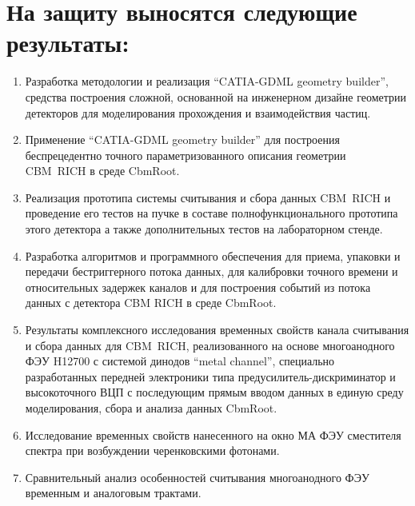 \section*{На защиту выносятся следующие результаты:}

\begin{enumerate}
\item Разработка методологии и реализация ``CATIA-GDML geometry builder'', средства построения сложной, основанной на инженерном дизайне геометрии детекторов для моделирования прохождения и взаимодействия частиц.
\item Применение ``CATIA-GDML geometry builder'' для построения беспрецедентно точного параметризованного описания геометрии CBM~RICH в среде CbmRoot.
\item Реализация прототипа системы считывания и сбора данных CBM~RICH и проведение его тестов на пучке в составе полнофункционального прототипа этого детектора а также дополнительных тестов на лабораторном стенде.
\item Разработка алгоритмов и программного обеспечения для приема, упаковки и передачи бестриггерного потока данных, для калибровки точного времени и относительных задержек каналов и для построения событий из потока данных с детектора CBM RICH в среде CbmRoot.
\item Результаты комплексного исследования временных свойств канала считывания и сбора данных для CBM~RICH, реализованного на основе многоанодного ФЭУ H12700 с системой динодов ``metal channel'', специально разработанных передней электроники типа предусилитель-дискриминатор и высокоточного ВЦП с последующим прямым вводом данных в единую среду моделирования, сбора и анализа данных CbmRoot.
\item Исследование временных свойств нанесенного на окно МА ФЭУ сместителя спектра при возбуждении черенковскими фотонами.
\item Сравнительный анализ особенностей считывания многоанодного ФЭУ временным и аналоговым трактами.
\end{enumerate}
